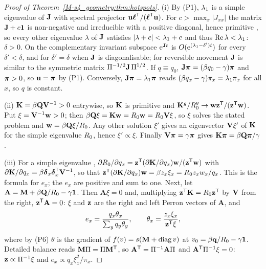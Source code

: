\begin{proof}[Proof of Theorem~\ref{M-s4_geometry:thm:hotspots}]
  (i) By (P1), $\lambda_1$ is a simple eigenvalue of $\mathbf{J}$ with spectral projector
  $\mathbf{u}\boldsymbol{\ell}^{\mathsf{T}}/(\boldsymbol{\ell}^{\mathsf{T}}\mathbf{u})$. For $c>\max_x|J_{xx}|$ the matrix $\mathbf{J}+c\mathbf{1}$ is non-negative and
  irreducible with a positive diagonal, hence primitive \citep{berman1994nonnegative}, so every other
  eigenvalue $\lambda$ of $\mathbf{J}$
  satisfies $|\lambda+c|<\lambda_1+c$ and thus $\operatorname{Re}\lambda<\lambda_1$: $\delta>0$. On the
  complementary invariant subspace $\mathrm{e}^{\mathbf{J} t}$ is $O(\mathrm{e}^{(\lambda_1-\delta')t})$ for every $\delta'<\delta$, and
  for $\delta'=\delta$ when $\mathbf{J}$ is diagonalisable; for reversible movement $\mathbf{J}$ is similar to the symmetric
  matrix $\Pi^{-1/2}\mathbf{J}\,\Pi^{1/2}$. If $q\equiv q_0$, $\mathbf{J}\boldsymbol{\pi}=(\beta q_0-\gamma)\boldsymbol{\pi}$ and $\boldsymbol{\pi}>0$, so
  $\mathbf{u}=\boldsymbol{\pi}$ by (P1). Conversely, $\mathbf{J}\boldsymbol{\pi}=\lambda_1\boldsymbol{\pi}$ reads $(\beta q_x-\gamma)\pi_x=\lambda_1\pi_x$ for all
  $x$, so $q$ is constant.

  (ii) $\mathbf{K}=\beta\mathbf{Q}\mathbf{V}^{-1}>0$ entrywise, so $\mathbf{K}$ is primitive and $\mathbf{K}^{g}/R_0^{g}\to\mathbf{w}\mathbf{z}^{\mathsf{T}}/(\mathbf{z}^{\mathsf{T}}\mathbf{w})$.
  Put $\xi=\mathbf{V}^{-1}\mathbf{w}>0$; then $\beta\mathbf{Q}\xi=\mathbf{K}\mathbf{w}=R_0\mathbf{w}=R_0\mathbf{V}\xi$, so $\xi$ solves the stated
  problem and $\mathbf{w}=\beta\mathbf{Q}\xi/R_0$. Any other solution $\xi'$ gives an eigenvector $\mathbf{V}\xi'$ of $\mathbf{K}$ for
  the simple eigenvalue $R_0$, hence $\xi'\propto\xi$. Finally $\mathbf{V}\boldsymbol{\pi}=\gamma\boldsymbol{\pi}$ gives
  $\mathbf{K}\boldsymbol{\pi}=\beta\mathbf{Q}\boldsymbol{\pi}/\gamma$.

  (iii) For a simple eigenvalue \citep{horn2013matrix},
  $\partial R_0/\partial q_x=\mathbf{z}^{\mathsf{T}}(\partial\mathbf{K}/\partial q_x)\mathbf{w}/(\mathbf{z}^{\mathsf{T}}\mathbf{w})$ with
  $\partial\mathbf{K}/\partial q_x=\beta\boldsymbol{\delta}_x\boldsymbol{\delta}_x^{\mathsf{T}}\mathbf{V}^{-1}$, so that
  $\mathbf{z}^{\mathsf{T}}(\partial\mathbf{K}/\partial q_x)\mathbf{w}=\beta z_x\xi_x=R_0 z_xw_x/q_x$. This is the formula for $e_x$;
  the $e_x$ are positive and sum to one. Next, let $\mathbf{A}=\mathbf{M}+\beta\mathbf{Q}/R_0-\gamma\mathbf{1}$. Then
  $\mathbf{A}\xi=0$ and, multiplying $\mathbf{z}^{\mathsf{T}}\mathbf{K}=R_0\mathbf{z}^{\mathsf{T}}$ by $\mathbf{V}$ from the right,
  $\mathbf{z}^{\mathsf{T}}\mathbf{A}=0$: $\xi$ and $\mathbf{z}$ are the right and left Perron vectors of $\mathbf{A}$, and
  \begin{equation}\label{s4_geometry:eq:theta}
     e_x=\frac{q_x\theta_x}{\sum_yq_y\theta_y},\qquad \theta_x=\frac{z_x\xi_x}{\mathbf{z}^{\mathsf{T}}\xi} ,
  \end{equation}
  where by (P6) $\theta$ is the gradient of $f(v)=s(\mathbf{M}+\operatorname{diag} v)$ at $v_0=\beta\mathbf{q}/R_0-\gamma\boldsymbol{1}$.
  Detailed balance reads $\mathbf{M}\Pi=\Pi\mathbf{M}^{\mathsf{T}}$, so $\mathbf{A}^{\mathsf{T}}=\Pi^{-1}\mathbf{A}\Pi$ and
  $\mathbf{A}^{\mathsf{T}}\Pi^{-1}\xi=0$: $\mathbf{z}\propto\Pi^{-1}\xi$ and $e_x\propto q_x\xi_x^2/\pi_x$.


\end{proof}
